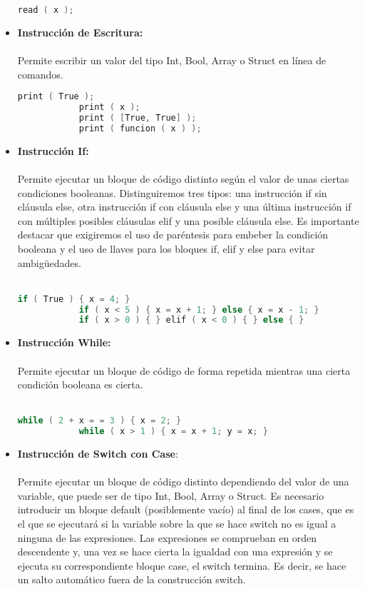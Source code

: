 \documentclass[12pt,onecolumn]{article}
\begin{document}
\begin{itemize}
		\begin{lstlisting}[language=C++]
			read ( x );
		\end{lstlisting}
		\bigskip
		\item \textbf{Instrucción de Escritura:} \\ \\
		Permite escribir un valor del tipo Int, Bool, Array o Struct en línea de comandos.\\
		\begin{lstlisting}[language=C++]
			print ( True );
			print ( x );
			print ( [True, True] );
			print ( funcion ( x ) );
		\end{lstlisting}
		\bigskip
		\item \textbf{Instrucción If:} \\ \\
		Permite ejecutar un bloque de código distinto según el valor de unas ciertas condiciones booleanas. Distinguiremos tres tipos: una instrucción if sin cláusula else, otra instrucción if con cláusula else y una última instrucción if con múltiples posibles cláusulas elif y una posible cláusula else. Es importante destacar que exigiremos el uso de paréntesis para embeber la condición booleana y el uso de llaves para los bloques if, elif y else para evitar ambigüedades. \\ \\
		\begin{lstlisting}[language=C++, gobble = 10]
			if ( True ) { x = 4; }
			if ( x < 5 ) { x = x + 1; } else { x = x - 1; }
			if ( x > 0 ) { } elif ( x < 0 ) { } else { }
		\end{lstlisting}
		\newpage
		\item \textbf{Instrucción While:} \\ \\
		Permite ejecutar un bloque de código de forma repetida mientras una cierta condición booleana es cierta.\\ \\
		\begin{lstlisting}[language=C++, gobble = 10]
			while ( 2 + x = = 3 ) { x = 2; }
			while ( x > 1 ) { x = x + 1; y = x; }
		\end{lstlisting}
		\bigskip
		\item \textbf{Instrucción de Switch con Case}: \\ \\
		Permite ejecutar un bloque de código distinto dependiendo del valor de una variable, que puede ser de tipo Int, Bool, Array o Struct. Es necesario introducir un bloque default (posiblemente vacío) al final de los cases, que es el que se ejecutará si la variable sobre la que se hace switch no es igual a ninguna de las expresiones. Las expresiones se comprueban en orden descendente y, una vez se hace cierta la igualdad con una expresión y se ejecuta su correspondiente bloque case, el switch termina. Es decir, se hace un salto automático fuera de la construcción switch. \\ \\


\end{itemize}
\end{document}
